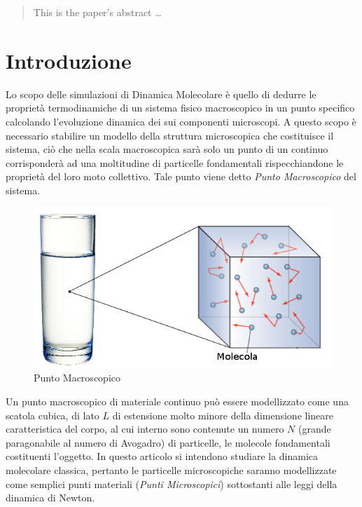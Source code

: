 \documentclass[11pt]{article}
\theoremstyle{plain}
\theoremstyle{remark}
\begin{document}
\maketitle

\begin{abstract}
This is the paper's abstract \ldots
\end{abstract}

\tableofcontents
\section{Introduzione}\label{Introduzione}
Lo scopo delle simulazioni di Dinamica Molecolare è quello di dedurre le proprietà termodinamiche di un sistema fisico macroscopico in un punto specifico calcolando l'evoluzione dinamica dei sui componenti microscopi.
A questo scopo è necessario stabilire un modello della struttura microscopica che costituisce il sistema, ciò che nella scala macroscopica sarà solo un punto di un continuo corrisponderà ad una moltitudine di particelle fondamentali rispecchiandone le proprietà del loro moto collettivo. Tale punto viene detto  \emph{Punto Macroscopico} del sistema.

\begin{figure}
\centering
\includegraphics[scale=0.5]{Immagini/PuntoMacro.png}
\caption[Punto Macroscopico]{Punto Macroscopico}\label{fig: PuntoMacro}
\end{figure}

Un punto macroscopico di materiale continuo può essere modellizzato come una scatola cubica, di lato $L$ di estensione molto minore della dimensione lineare caratteristica del corpo, al cui interno sono contenute un numero $N$ (grande paragonabile al numero di Avogadro) di particelle, le molecole fondamentali costituenti l'oggetto.
In questo articolo si intendono studiare la dinamica molecolare classica, pertanto le particelle microscopiche saranno modellizzate come semplici punti materiali (\emph{Punti Microscopici}) sottostanti alle leggi della dinamica di Newton.
\end{document}
